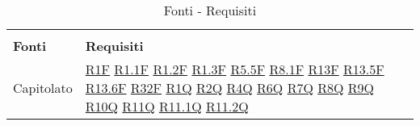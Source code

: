 
\begin{center}
    \centering
    \renewcommand{\arraystretch}{1.8}
    \label{tab:FontiRequisiti}
    \begin{longtable}[!h]{m{50px} m{50px}}
        \rowcolor{white}\caption{Fonti - Requisiti}                                     \\
        \rowcolor{logo!70} \textbf{Fonti} & \textbf{Requisiti}                          \\
        Capitolato                        & \hyperref[tab:RequisitiFunzionali]{R1F}
        \newline \hyperref[tab:RequisitiFunzionali]{R1.1F}
        \newline \hyperref[tab:RequisitiFunzionali]{R1.2F}
        \newline \hyperref[tab:RequisitiFunzionali]{R1.3F}
        \newline \hyperref[tab:RequisitiFunzionali]{R5.5F}
        \newline \hyperref[tab:RequisitiFunzionali]{R8.1F}
        \newline \hyperref[tab:RequisitiFunzionali]{R13F}
        \newline \hyperref[tab:RequisitiFunzionali]{R13.5F}
        \newline \hyperref[tab:RequisitiFunzionali]{R13.6F}
        \newline \hyperref[tab:RequisitiFunzionali]{R32F}
        \newline \hyperref[tab:RequisitiQualita]{R1Q}
        \newline \hyperref[tab:RequisitiQualita]{R2Q}
        \newline \hyperref[tab:RequisitiQualita]{R4Q}
        \newline \hyperref[tab:RequisitiQualita]{R6Q}
        \newline \hyperref[tab:RequisitiQualita]{R7Q}
        \newline \hyperref[tab:RequisitiQualita]{R8Q}
        \newline \hyperref[tab:RequisitiQualita]{R9Q}
        \newline \hyperref[tab:RequisitiQualita]{R10Q}
        \newline \hyperref[tab:RequisitiQualita]{R11Q}
        \newline \hyperref[tab:RequisitiQualita]{R11.1Q}
        \newline \hyperref[tab:RequisitiQualita]{R11.2Q}

\end{longtable}
\end{center}
